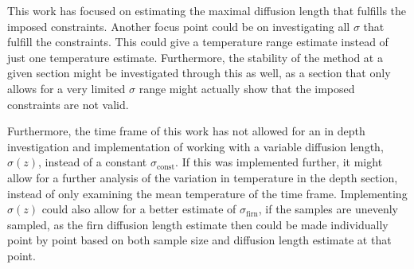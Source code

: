 \documentclass[../../CompleteThesis2/Complete_2ndDraft]{subfiles}
\begin{document}
This work has focused on estimating the maximal diffusion length that fulfills the imposed constraints. Another focus point could be on investigating all $\sigma$ that fulfill the constraints. This could give a temperature range estimate instead of just one temperature estimate. Furthermore, the stability of the method at a given section might be investigated through this as well, as a section that only allows for a very limited $\sigma$ range might actually show that the imposed constraints are not valid.


Furthermore, the time frame of this work has not allowed for an in depth investigation and implementation of working with a variable diffusion length, $\sigma(z)$, instead of a constant $\sigma_{\text{const}}$. If this was implemented further, it might allow for a further analysis of the variation in temperature in the depth section, instead of only examining the mean temperature of the time frame. Implementing $\sigma(z)$ could also allow for a better estimate of $\sigma_{\text{firn}}$, if the samples are unevenly sampled, as the firn diffusion length estimate then could be made individually point by point based on both sample size and diffusion length estimate at that point.

%
\end{document}
